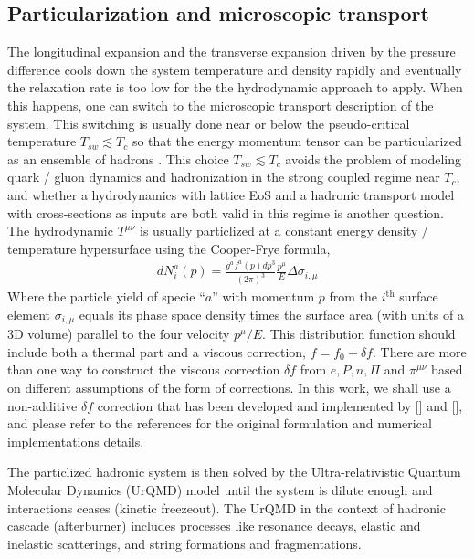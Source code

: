 \subsection{Particularization and microscopic transport}
The longitudinal expansion and the transverse expansion driven by the pressure difference cools down the system temperature and density rapidly and eventually the relaxation rate is too low for the the hydrodynamic approach to apply.
When this happens, one can switch to the microscopic transport description of the system.
This switching is usually done near or below the pseudo-critical temperature $T_{sw} \lesssim T_c$ so that the energy momentum tensor can be particularized as an ensemble of hadrons .
This choice $T_{sw} \lesssim T_c$ avoids the problem of modeling quark / gluon dynamics and hadronization in the strong coupled regime near $T_c$, and whether a hydrodynamics with lattice EoS and a hadronic transport model with cross-sections as inputs are both valid in this regime is another question.
The hydrodynamic $T^{\mu\nu}$ is usually particlized at a constant energy density / temperature hypersurface using the Cooper-Frye formula,
\begin{eqnarray}
dN_i^a(p) = \frac{g^a f^a(p) dp^3}{(2\pi)^3}  \frac{p^{\mu}}{E} \Delta \sigma_{i,\mu} 
\end{eqnarray}
Where the particle yield of specie ``$a$'' with momentum $p$ from the $i^{\textrm{th}}$ surface element $\sigma_{i,\mu}$ equals its phase space density times the surface area (with units of a 3D volume) parallel to the  four velocity $p^\mu/E$.
This distribution function should include both a thermal part and a viscous correction, $f = f_0 + \delta f$.
There are more than one way to construct the viscous correction $\delta f$  from $e, P, n, \Pi$ and $\pi^{\mu\nu}$ based on different assumptions of the form of corrections.
In this work, we shall use a non-additive $\delta f$ correction that has been developed and implemented by [] and [], and please refer to the references for the original formulation and numerical implementations details.

The particlized hadronic system is then solved by the Ultra-relativistic Quantum Molecular Dynamics (UrQMD) model until the system is dilute enough and interactions ceases (kinetic freezeout). 
The UrQMD in the context of hadronic cascade (afterburner) includes processes like resonance decays, elastic and inelastic scatterings, and string formations and fragmentations.

